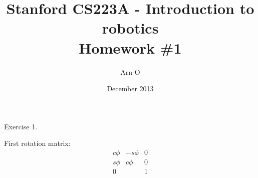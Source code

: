 \documentclass{article}
\begin{document}
\title{Stanford CS223A - Introduction to robotics \\
  Homework \#1}
\author{Arn-O}
\date{December 2013}
\maketitle

Exercise 1.

First rotation matrix:
$$\begin{matrix}
  c\phi & -s\phi & 0 \\
  s\phi & c\phi  & 0 \\
  0     &        & 1
\end{matrix}$$
\end{document}
